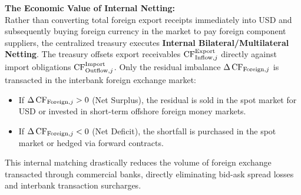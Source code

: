 \vspace{0.2em}
\noindent\textbf{The Economic Value of Internal Netting:}\\
Rather than converting total foreign export receipts immediately into USD and subsequently buying foreign currency in the market to pay foreign component suppliers, the centralized treasury executes \textbf{Internal Bilateral/Multilateral Netting}. The treasury offsets export receivables $\operatorname{CF}_{\text{Inflow}, j}^{\text{Export}}$ directly against import obligations $\operatorname{CF}_{\text{Outflow}, j}^{\text{Import}}$. Only the residual imbalance $\Delta \operatorname{CF}_{\text{Foreign}, j}$ is transacted in the interbank foreign exchange market:
\begin{itemize}[noitemsep]
    \item If $\Delta \operatorname{CF}_{\text{Foreign}, j} > 0$ (Net Surplus), the residual is sold in the spot market for USD or invested in short-term offshore foreign money markets.
    \item If $\Delta \operatorname{CF}_{\text{Foreign}, j} < 0$ (Net Deficit), the shortfall is purchased in the spot market or hedged via forward contracts.
\end{itemize}
This internal matching drastically reduces the volume of foreign exchange transacted through commercial banks, directly eliminating bid-ask spread losses and interbank transaction surcharges.

\vspace{0.3em}

